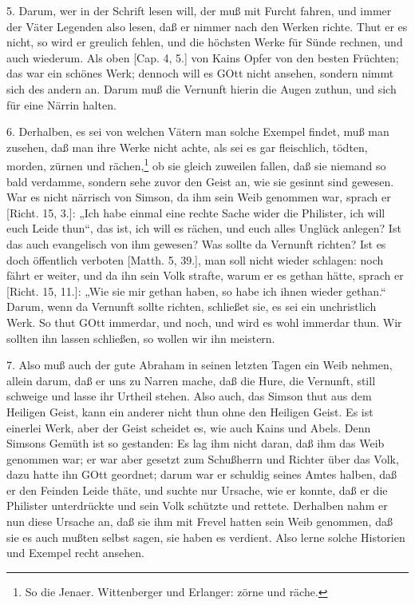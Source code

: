 5. Darum, wer in der Schrift lesen will, der muß mit Furcht fahren, und immer der Väter Legenden also lesen, daß er nimmer nach den Werken richte. Thut er es nicht, so wird er greulich fehlen, und die höchsten Werke für Sünde rechnen, und auch wiederum. Als oben [Cap. 4, 5.] von Kains Opfer von den besten Früchten; das war ein schönes Werk; dennoch will es GOtt nicht ansehen, sondern nimmt sich des andern an. Darum muß die Vernunft hierin die Augen zuthun, und sich für eine Närrin halten.

6. Derhalben, es sei von welchen Vätern man solche Exempel findet, muß man zusehen, daß man ihre Werke nicht achte, als sei es gar fleischlich, tödten, morden, zürnen und rächen,\footnote{So die Jenaer. Wittenberger und Erlanger: zörne und räche.} ob sie gleich zuweilen fallen, daß sie niemand so bald verdamme, sondern sehe zuvor den Geist an, wie sie gesinnt sind gewesen. War es nicht närrisch von Simson, da ihm sein Weib genommen war, sprach er [Richt. 15, 3.]: „Ich habe einmal eine rechte Sache wider die Philister, ich will euch Leide thun“, das ist, ich will es rächen, und euch alles Unglück anlegen? Ist das auch evangelisch von ihm gewesen? Was sollte da Vernunft richten? Ist es doch öffentlich verboten [Matth. 5, 39.], man soll nicht wieder schlagen: noch fährt er weiter, und da ihn sein Volk strafte,
warum er es gethan hätte, sprach er [Richt. 15, 11.]: „Wie sie mir gethan haben, so habe ich ihnen wieder gethan.“ Darum, wenn da Vernunft sollte richten, schließet sie, es sei ein unchristlich Werk. So thut GOtt immerdar, und noch, und wird es wohl immerdar thun. Wir sollten ihn lassen schließen, so wollen wir ihn meistern.

7. Also muß auch der gute Abraham in seinen letzten Tagen ein Weib nehmen, allein darum, daß er uns zu Narren mache, daß die Hure, die Vernunft, still schweige und lasse ihr Urtheil stehen. Also auch, das Simson thut aus dem Heiligen Geist, kann ein anderer nicht thun ohne den Heiligen Geist. Es ist einerlei Werk, aber der Geist scheidet es, wie auch Kains und Abels. Denn Simsons Gemüth ist so gestanden: Es lag ihm nicht daran, daß ihm das Weib genommen war; er war aber gesetzt zum Schußherrn und Richter über das Volk, dazu hatte ihn GOtt geordnet; darum war er schuldig seines Amtes halben, daß er den Feinden Leide thäte, und suchte nur Ursache, wie er konnte, daß er die Philister unterdrückte und sein Volk schützte und rettete. Derhalben nahm er nun diese Ursache an, daß sie ihm mit Frevel hatten sein Weib genommen, daß sie es auch mußten selbst sagen, sie haben es verdient. Also lerne solche Historien und Exempel recht ansehen.

